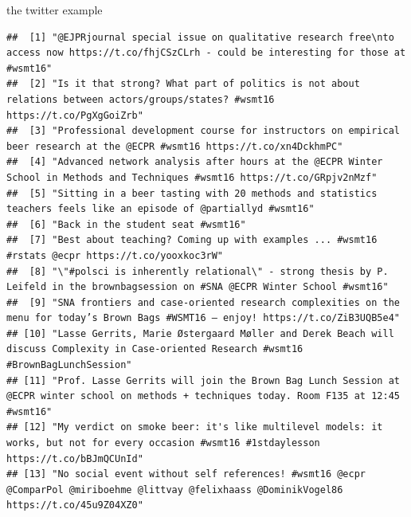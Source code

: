 \documentclass[ignorenonframetext,]{beamer}
\newenvironment{Shaded}{\begin{snugshade}}{\end{snugshade}}
\newcommand{\KeywordTok}[1]{\textcolor[rgb]{0.13,0.29,0.53}{\textbf{{#1}}}}
\newcommand{\DataTypeTok}[1]{\textcolor[rgb]{0.13,0.29,0.53}{{#1}}}
\newcommand{\StringTok}[1]{\textcolor[rgb]{0.31,0.60,0.02}{{#1}}}
\newcommand{\OtherTok}[1]{\textcolor[rgb]{0.56,0.35,0.01}{{#1}}}
\newcommand{\NormalTok}[1]{{#1}}
\begin{document}
\begin{frame}[fragile]{the twitter example}

\begin{Shaded}
\end{Shaded}

\begin{verbatim}
##  [1] "@EJPRjournal special issue on qualitative research free\nto access now https://t.co/fhjCSzCLrh - could be interesting for those at #wsmt16"    
##  [2] "Is it that strong? What part of politics is not about relations between actors/groups/states? #wsmt16 https://t.co/PgXgGoiZrb"                 
##  [3] "Professional development course for instructors on empirical beer research at the @ECPR #wsmt16 https://t.co/xn4DckhmPC"                       
##  [4] "Advanced network analysis after hours at the @ECPR Winter School in Methods and Techniques #wsmt16 https://t.co/GRpjv2nMzf"                    
##  [5] "Sitting in a beer tasting with 20 methods and statistics teachers feels like an episode of @partiallyd #wsmt16"                                
##  [6] "Back in the student seat #wsmt16"                                                                                                              
##  [7] "Best about teaching? Coming up with examples ... #wsmt16 #rstats @ecpr https://t.co/yooxkoc3rW"                                                
##  [8] "\"#polsci is inherently relational\" - strong thesis by P. Leifeld in the brownbagsession on #SNA @ECPR Winter School #wsmt16"                 
##  [9] "SNA frontiers and case-oriented research complexities on the menu for today’s Brown Bags #WSMT16 – enjoy! https://t.co/ZiB3UQB5e4"             
## [10] "Lasse Gerrits, Marie Østergaard Møller and Derek Beach will discuss Complexity in Case-oriented Research #wsmt16 #BrownBagLunchSession"        
## [11] "Prof. Lasse Gerrits will join the Brown Bag Lunch Session at @ECPR winter school on methods + techniques today. Room F135 at 12:45 #wsmt16"    
## [12] "My verdict on smoke beer: it's like multilevel models: it works, but not for every occasion #wsmt16 #1stdaylesson https://t.co/bBJmQCUnId"     
## [13] "No social event without self references! #wsmt16 @ecpr @ComparPol @miriboehme @littvay @felixhaass @DominikVogel86 https://t.co/45u9Z04XZ0"    

\end{verbatim}
\end{frame}
\end{document}
